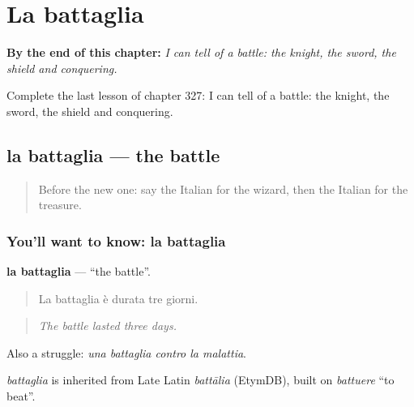 
\chapter{La battaglia}
\label{ch:it-la-battaglia}

\begin{chapteropening}
\textbf{By the end of this chapter:} \emph{I can tell of a battle: the knight, the sword, the shield and conquering.}

Complete the last lesson of chapter 327: I can tell of a battle: the knight, the sword, the shield and conquering.
\end{chapteropening}

\section[la battaglia]{la battaglia — the battle}

\label{lesson:IT-C327-battaglia}



\begin{quote}
Before the new one: say the Italian for the wizard, then the Italian for the treasure.
\end{quote}

\subsection*{You'll want to know: la battaglia}
\textbf{la battaglia} — \textquotedblleft{}the battle\textquotedblright{}.

\begin{quote}
La battaglia è durata tre giorni.
\end{quote}

\begin{quote}
\emph{The battle lasted three days.}
\end{quote}

Also a struggle: \emph{una battaglia contro la malattia}.

\begin{cousinweb}
\emph{battaglia} is inherited from Late Latin \emph{battālia} (EtymDB), built on \emph{battuere} \textquotedblleft{}to beat\textquotedblright{}.
\end{cousinweb}

